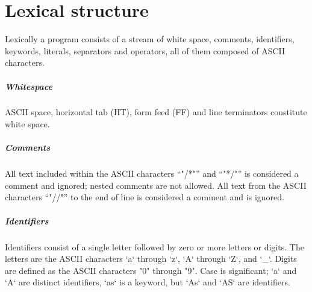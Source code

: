 \chapter{Lexical structure}


Lexically a program consists of a stream of white space, comments,
identifiers, keywords, literals, separators and operators, all of them
composed of ASCII characters. 

\paragraph{Whitespace}
ASCII space, horizontal tab (HT), form feed (FF) and line
terminators constitute white space.

\paragraph{Comments}
All text included within the ASCII characters ``\xcd"/*"'' and
``\xcd"*/"'' is
considered a comment and ignored; nested comments are not
allowed.  All text from the ASCII characters
``\xcd"//"'' to the end of line is considered a comment and is ignored.

\paragraph{Identifiers}

Identifiers consist of a single letter followed by zero or more
letters or digits.
The letters are the ASCII characters \xcd`a` through \xcd`z`, \xcd`A` through
\xcd`Z`, and \xcd`_`.
Digits are defined as the ASCII characters \xcd"0" through \xcd"9". Case is
significant; \xcd`a` and \xcd`A` are distinct identifiers, \xcd`as` is a
keyword, but \xcd`As` and \xcd`AS` are identifiers.

